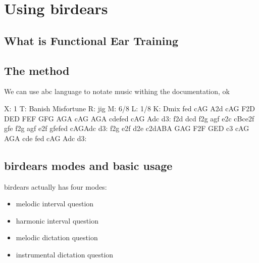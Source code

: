 \documentclass[letterpaper,10pt,english]{sphinxmanual}
\begin{document}
\chapter{Using birdears}
\label{\detokenize{using:using-birdears}}\label{\detokenize{using::doc}}

\section{What is Functional Ear Training}
\label{\detokenize{using:what-is-functional-ear-training}}


\section{The method}
\label{\detokenize{using:the-method}}
We can use abc language to notate music withing the documentation, ok

\begin{sphinxVerbatim}[commandchars=\\\{\}]
X: 1
T: Banish Misfortune
R: jig
M: 6/8
L: 1/8
K: Dmix
fed cAG\textbar{} A2d cAG\textbar{} F2D DED\textbar{} FEF GFG\textbar{}
AGA cAG\textbar{} AGA cde\textbar{}fed cAG\textbar{} Ad\PYGZca{}c d3:\textbar{}
f2d d\PYGZca{}cd\textbar{} f2g agf\textbar{} e2c cBc\textbar{}e2f gfe\textbar{}
f2g agf\textbar{} e2f gfe\textbar{}fed cAG\textbar{}Ad\PYGZca{}c d3:\textbar{}
f2g e2f\textbar{} d2e c2d\textbar{}ABA GAG\textbar{} F2F GED\textbar{}
c3 cAG\textbar{} AGA cde\textbar{} fed cAG\textbar{} Ad\PYGZca{}c d3:\textbar{}
\end{sphinxVerbatim}


\section{birdears modes and basic usage}
\label{\detokenize{using:birdears-modes-and-basic-usage}}
birdears actually has four modes:
\begin{itemize}
\item {} 
melodic interval question

\item {} 
harmonic interval question

\item {} 
melodic dictation question

\item {} 
instrumental dictation question

\end{itemize}
\end{document}
